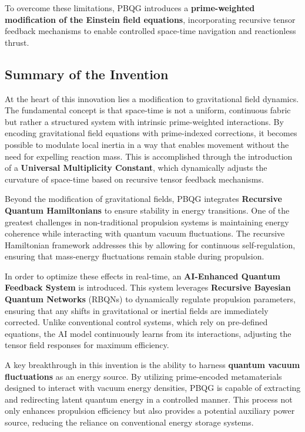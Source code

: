 \documentclass{article}
\theoremstyle{plain}
\begin{document}
To overcome these limitations, PBQG introduces a \textbf{prime-weighted modification of the Einstein field equations}, incorporating recursive tensor feedback mechanisms to enable controlled space-time navigation and reactionless thrust.

\subsection{Summary of the Invention}
\label{subsec:summary}

At the heart of this innovation lies a modification to gravitational field dynamics. The fundamental concept is that space-time is not a uniform, continuous fabric but rather a structured system with intrinsic prime-weighted interactions. By encoding gravitational field equations with prime-indexed corrections, it becomes possible to modulate local inertia in a way that enables movement without the need for expelling reaction mass. This is accomplished through the introduction of a \textbf{Universal Multiplicity Constant}, which dynamically adjusts the curvature of space-time based on recursive tensor feedback mechanisms.

Beyond the modification of gravitational fields, PBQG integrates \textbf{Recursive Quantum Hamiltonians} to ensure stability in energy transitions. One of the greatest challenges in non-traditional propulsion systems is maintaining energy coherence while interacting with quantum vacuum fluctuations. The recursive Hamiltonian framework addresses this by allowing for continuous self-regulation, ensuring that mass-energy fluctuations remain stable during propulsion.

In order to optimize these effects in real-time, an \textbf{AI-Enhanced Quantum Feedback System} is introduced. This system leverages \textbf{Recursive Bayesian Quantum Networks} (RBQNs) to dynamically regulate propulsion parameters, ensuring that any shifts in gravitational or inertial fields are immediately corrected. Unlike conventional control systems, which rely on pre-defined equations, the AI model continuously learns from its interactions, adjusting the tensor field responses for maximum efficiency.

A key breakthrough in this invention is the ability to harness \textbf{quantum vacuum fluctuations} as an energy source. By utilizing prime-encoded metamaterials designed to interact with vacuum energy densities, PBQG is capable of extracting and redirecting latent quantum energy in a controlled manner. This process not only enhances propulsion efficiency but also provides a potential auxiliary power source, reducing the reliance on conventional energy storage systems.
\end{document}
